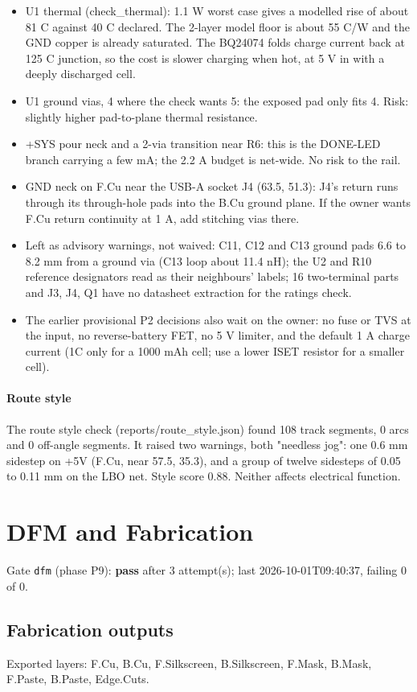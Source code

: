 \documentclass[11pt]{article}
\begin{document}
\begin{itemize}
\item U1 thermal (check\_thermal): 1.1 W worst case gives a modelled rise of about 81 C against 40 C declared. The 2-layer model floor is about 55 C/W and the GND copper is already saturated. The BQ24074 folds charge current back at 125 C junction, so the cost is slower charging when hot, at 5 V in with a deeply discharged cell.
\item U1 ground vias, 4 where the check wants 5: the exposed pad only fits 4. Risk: slightly higher pad-to-plane thermal resistance.
\item +SYS pour neck and a 2-via transition near R6: this is the DONE-LED branch carrying a few mA; the 2.2 A budget is net-wide. No risk to the rail.
\item GND neck on F.Cu near the USB-A socket J4 (63.5, 51.3): J4's return runs through its through-hole pads into the B.Cu ground plane. If the owner wants F.Cu return continuity at 1 A, add stitching vias there.
\item Left as advisory warnings, not waived: C11, C12 and C13 ground pads 6.6 to 8.2 mm from a ground via (C13 loop about 11.4 nH); the U2 and R10 reference designators read as their neighbours' labels; 16 two-terminal parts and J3, J4, Q1 have no datasheet extraction for the ratings check.
\item The earlier provisional P2 decisions also wait on the owner: no fuse or TVS at the input, no reverse-battery FET, no 5 V limiter, and the default 1 A charge current (1C only for a 1000 mAh cell; use a lower ISET resistor for a smaller cell).
\end{itemize}
\paragraph*{Route style}
The route style check (reports/route\_style.json) found 108 track segments, 0 arcs and 0 off-angle segments. It raised two warnings, both "needless jog": one 0.6 mm sidestep on +5V (F.Cu, near 57.5, 35.3), and a group of twelve sidesteps of 0.05 to 0.11 mm on the LBO net. Style score 0.88. Neither affects electrical function.

\section{DFM and Fabrication}
Gate \texttt{dfm} (phase P9): \textbf{pass} after 3 attempt(s); last 2026-10-01T09:40:37, failing 0 of 0.
\subsection*{Fabrication outputs}
Exported layers: F.Cu, B.Cu, F.Silkscreen, B.Silkscreen, F.Mask, B.Mask, F.Paste, B.Paste, Edge.Cuts.
\end{document}
